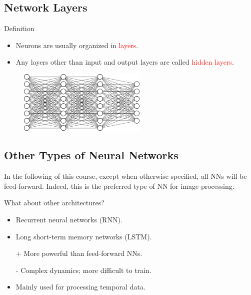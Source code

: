 \documentclass{book}
\newcommand{\alert}[1]{\textcolor{red}{#1}}
\begin{document}
\subsection{Network Layers}

\begin{block}{Definition}
\begin{itemize}
\item Neurons are usually organized in \alert{layers}.
\item Any layers other than input and output layers are called \alert{hidden layers}.
\end{itemize}
\end{block}

\begin{figure}[h]
    \centering
    \includegraphics[height=3cm]{mini_reseau3_bis}
\end{figure}

\subsection{Other Types of Neural Networks}

\begin{block}{}
In the following of this course, except when otherwise specified, all NNs will be feed-forward. Indeed, this is the preferred type of NN for image processing.
\end{block}

\begin{block}{What about other architectures?}
\begin{itemize}
\item Recurrent neural networks (RNN).
\item Long short-term memory networks (LSTM).
\end{itemize}
\end{block}

\begin{itemize}
\item[+] More powerful than feed-forward NNs.
\item[-] Complex dynamics; more difficult to train.
\item Mainly used for processing temporal data.
\end{itemize}
\end{document}
